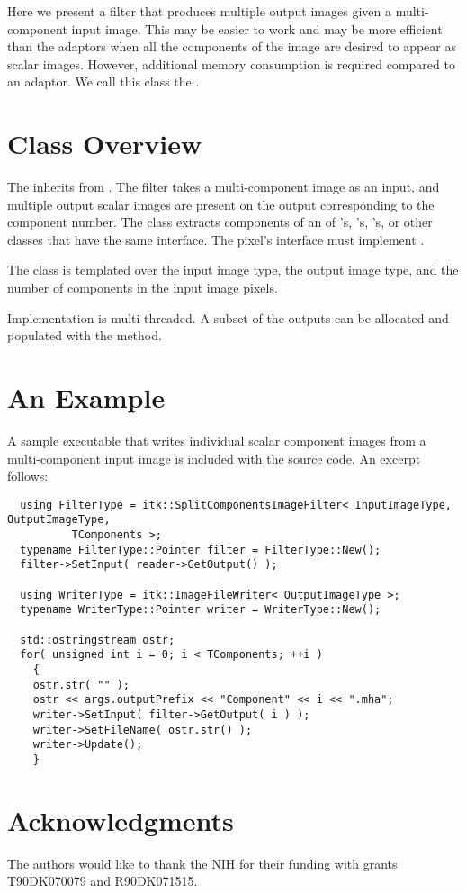 \documentclass{InsightArticle}
\begin{document}
Here we present a filter that produces multiple output images given a
multi-component input image.  This may be easier to work and may be more efficient
than the adaptors when all the components of the image are desired to appear as
scalar images.  However, additional memory consumption is required compared to
an adaptor.  We call this class the .

\section{Class Overview}

The  inherits from
.  The filter takes a multi-component image as an
input, and multiple output scalar images are present on the output corresponding
to the component number.  The class extracts components of an  of
's, 's,
's, or other classes that have the same
interface.  The pixel's interface must implement .

The class is templated over the input image type, the output image type, and the
number of components in the input image pixels.

Implementation is multi-threaded.  A subset of the outputs can be allocated and
populated with the  method.

\section{An Example}

A sample executable that writes individual scalar component images from a
multi-component input image is included with the source code.  An excerpt
follows:

\begin{verbatim}
  using FilterType = itk::SplitComponentsImageFilter< InputImageType, OutputImageType,
          TComponents >;
  typename FilterType::Pointer filter = FilterType::New();
  filter->SetInput( reader->GetOutput() );

  using WriterType = itk::ImageFileWriter< OutputImageType >;
  typename WriterType::Pointer writer = WriterType::New();

  std::ostringstream ostr;
  for( unsigned int i = 0; i < TComponents; ++i )
    {
    ostr.str( "" );
    ostr << args.outputPrefix << "Component" << i << ".mha";
    writer->SetInput( filter->GetOutput( i ) );
    writer->SetFileName( ostr.str() );
    writer->Update();
    }
\end{verbatim}

\section{Acknowledgments}

The authors would like to thank the NIH for their funding with grants
T90DK070079 and R90DK071515.
\end{document}
